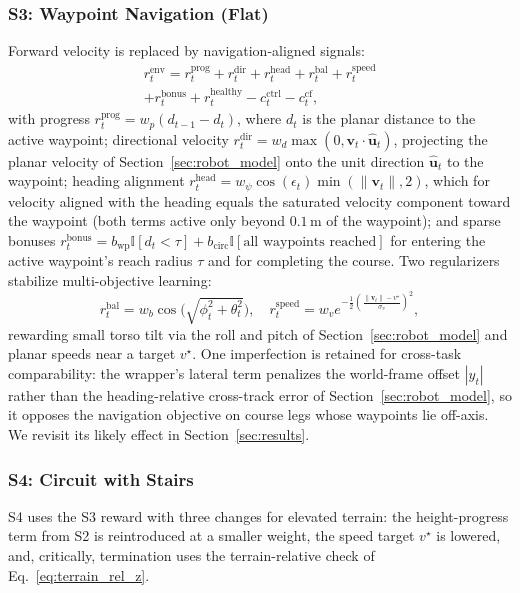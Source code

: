 \documentclass[conference,a4paper]{IEEEtran}
\begin{document}
\subsubsection{S3: Waypoint Navigation (Flat)} Forward velocity is replaced by navigation-aligned signals:
\begin{multline}
\label{eq:s3_reward}
r_t^{\mathrm{env}} = r_t^{\mathrm{prog}} + r_t^{\mathrm{dir}} + r_t^{\mathrm{head}} + r_t^{\mathrm{bal}} + r_t^{\mathrm{speed}} \\ + r_t^{\mathrm{bonus}} + r_t^{\mathrm{healthy}} - c_t^{\mathrm{ctrl}} - c_t^{\mathrm{cf}},
\end{multline}
with progress $r_t^{\mathrm{prog}} = w_p (d_{t-1} - d_t)$, where $d_t$ is the planar distance to the active waypoint; directional velocity $r_t^{\mathrm{dir}} = w_d \max(0, \mathbf{v}_t \!\cdot\! \hat{\mathbf{u}}_t)$, projecting the planar velocity of Section~\ref{sec:robot_model} onto the unit direction $\hat{\mathbf{u}}_t$ to the waypoint; heading alignment $r_t^{\mathrm{head}} = w_\psi \cos(\epsilon_t) \min(\lVert\mathbf{v}_t\rVert, 2)$, which for velocity aligned with the heading equals the saturated velocity component toward the waypoint (both terms active only beyond $0.1$\,m of the waypoint); and sparse bonuses $r_t^{\mathrm{bonus}} = b_{\mathrm{wp}} \mathbb{I}[d_t < \tau] + b_{\mathrm{circ}} \mathbb{I}[\text{all waypoints reached}]$ for entering the active waypoint's reach radius $\tau$ and for completing the course. Two regularizers stabilize multi-objective learning:
\begin{equation}
\label{eq:s3_balance_speed}
r_t^{\mathrm{bal}} = w_b \cos\!\Big(\sqrt{\phi_t^2 + \theta_t^2}\Big), \quad
r_t^{\mathrm{speed}} = w_v e^{-\frac{1}{2}\left(\frac{\lVert\mathbf{v}_t\rVert - v^\star}{\sigma_v}\right)^2},
\end{equation}
rewarding small torso tilt via the roll and pitch of Section~\ref{sec:robot_model} and planar speeds near a target $v^\star$. One imperfection is retained for cross-task comparability: the wrapper's lateral term penalizes the world-frame offset $|y_t|$ rather than the heading-relative cross-track error of Section~\ref{sec:robot_model}, so it opposes the navigation objective on course legs whose waypoints lie off-axis. We revisit its likely effect in Section~\ref{sec:results}.

\subsubsection{S4: Circuit with Stairs} S4 uses the S3 reward with three changes for elevated terrain: the height-progress term from S2 is reintroduced at a smaller weight, the speed target $v^\star$ is lowered, and, critically, termination uses the terrain-relative check of Eq.~\eqref{eq:terrain_rel_z}.
\end{document}
